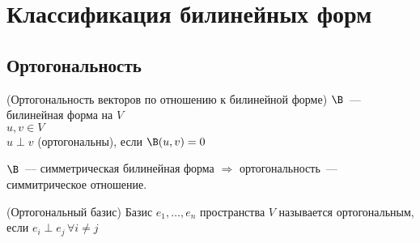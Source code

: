 \section*{Классификация билинейных форм}

\subsection*{Ортогональность}

\begin{conj}(Ортогональность векторов по отношению к билинейной форме)
    $\B$~--- билинейная форма на $V$ \\
    $u, v \in V$ \\
    $u \perp v$ (ортогональны), если $\B(u, v) = 0$
\end{conj}

\notice $\B$~--- симметрическая билинейная форма
$\Longrightarrow$ ортогональность~--- симмитрическое отношение.

\begin{conj}(Ортогональный базис)
    Базис $e_1, \dots, e_n$ пространства $V$ называется ортогональным,
    если $e_i \perp e_j \, \forall i \neq j$
\end{conj}

